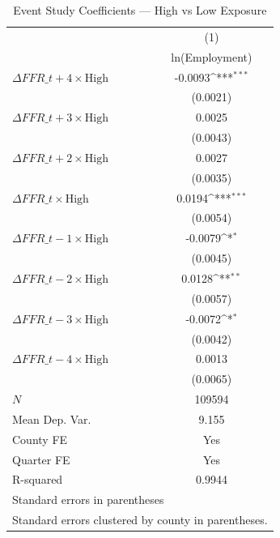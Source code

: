 \begin{table}[htbp]\centering
\def\sym#1{\ifmmode^{#1}\else\(^{#1}\)\fi}
\caption{Event Study Coefficients --- High vs Low Exposure}
\begin{tabular}{l*{1}{c}}
\toprule
            &\multicolumn{1}{c}{(1)}\\
            &\multicolumn{1}{c}{ln(Employment)}\\
\midrule
$\Delta FFR\_{t+4} \times \text{High}$&     -0.0093\sym{***}\\
            &    (0.0021)         \\
\addlinespace
$\Delta FFR\_{t+3} \times \text{High}$&      0.0025         \\
            &    (0.0043)         \\
\addlinespace
$\Delta FFR\_{t+2} \times \text{High}$&      0.0027         \\
            &    (0.0035)         \\
\addlinespace
$\Delta FFR\_t \times \text{High}$&      0.0194\sym{***}\\
            &    (0.0054)         \\
\addlinespace
$\Delta FFR\_{t-1} \times \text{High}$&     -0.0079\sym{*}  \\
            &    (0.0045)         \\
\addlinespace
$\Delta FFR\_{t-2} \times \text{High}$&      0.0128\sym{**} \\
            &    (0.0057)         \\
\addlinespace
$\Delta FFR\_{t-3} \times \text{High}$&     -0.0072\sym{*}  \\
            &    (0.0042)         \\
\addlinespace
$\Delta FFR\_{t-4} \times \text{High}$&      0.0013         \\
            &    (0.0065)         \\
\midrule
\(N\)       &      109594         \\
Mean Dep. Var.&       9.155         \\
County FE   &         Yes         \\
Quarter FE  &         Yes         \\
R-squared   &      0.9944         \\
\bottomrule
\multicolumn{2}{l}{\footnotesize Standard errors in parentheses}\\
\multicolumn{2}{l}{\footnotesize Standard errors clustered by county in parentheses.}\\

\end{tabular}
\end{table}
